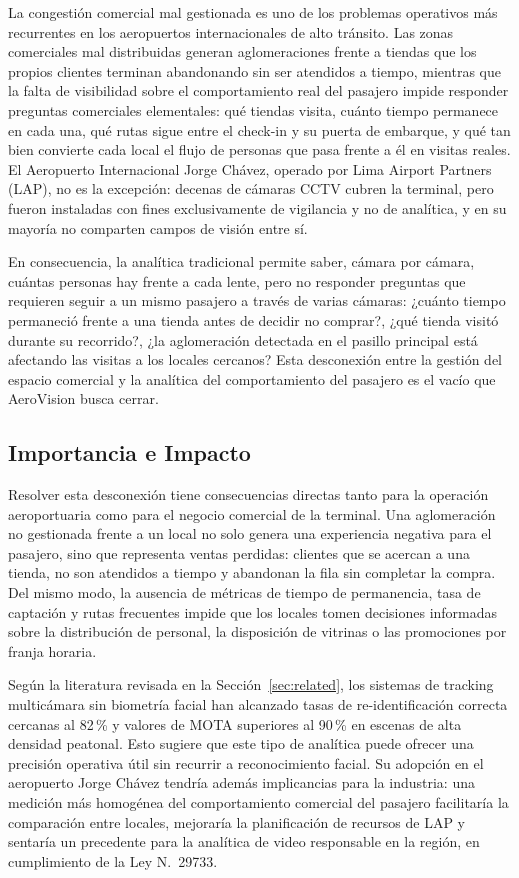 \documentclass[12pt,letterpaper]{article}
\begin{document}
La congestión comercial mal gestionada es uno de los problemas operativos
más recurrentes en los aeropuertos internacionales de alto tránsito. Las
zonas comerciales mal distribuidas generan aglomeraciones frente a tiendas
que los propios clientes terminan abandonando sin ser atendidos a tiempo,
mientras que la falta de visibilidad sobre el comportamiento real del
pasajero impide responder preguntas comerciales elementales: qué tiendas
visita, cuánto tiempo permanece en cada una, qué rutas sigue entre el
check-in y su puerta de embarque, y qué tan bien convierte cada local el
flujo de personas que pasa frente a él en visitas reales. El Aeropuerto
Internacional Jorge Chávez, operado por Lima Airport Partners (LAP), no es
la excepción: decenas de cámaras CCTV cubren la terminal, pero fueron
instaladas con fines exclusivamente de vigilancia y no de analítica, y en
su mayoría no comparten campos de visión entre sí.

En consecuencia, la analítica tradicional permite saber, cámara por
cámara, cuántas personas hay frente a cada lente, pero no responder
preguntas que requieren seguir a un mismo pasajero a través de varias
cámaras: ¿cuánto tiempo permaneció frente a una tienda antes de decidir
no comprar?, ¿qué tienda visitó durante su recorrido?, ¿la aglomeración
detectada en el pasillo principal está afectando las visitas a los
locales cercanos? Esta desconexión entre la gestión del espacio comercial
y la analítica del comportamiento del pasajero es el vacío que AeroVision
busca cerrar.

\subsection{Importancia e Impacto}

Resolver esta desconexión tiene consecuencias directas tanto para la
operación aeroportuaria como para el negocio comercial de la terminal.
Una aglomeración no gestionada frente a un local no solo genera una
experiencia negativa para el pasajero, sino que representa ventas
perdidas: clientes que se acercan a una tienda, no son atendidos a tiempo
y abandonan la fila sin completar la compra. Del mismo modo, la ausencia
de métricas de tiempo de permanencia, tasa de captación y rutas
frecuentes impide que los locales tomen decisiones informadas sobre la
distribución de personal, la disposición de vitrinas o las promociones
por franja horaria.

Según la literatura revisada en la Sección~\ref{sec:related}, los
sistemas de tracking multicámara sin biometría facial han alcanzado tasas
de re-identificación correcta cercanas al 82\,\% y valores de MOTA
superiores al 90\,\% en escenas de alta densidad peatonal. Esto sugiere
que este tipo de analítica puede ofrecer una precisión operativa útil sin
recurrir a reconocimiento facial. Su adopción en el aeropuerto Jorge
Chávez tendría además implicancias para la industria: una medición más
homogénea del comportamiento comercial del pasajero facilitaría la
comparación entre locales, mejoraría la planificación de recursos de LAP
y sentaría un precedente para la analítica de video responsable en la
región, en cumplimiento de la Ley N.\textdegree~29733.
\end{document}
